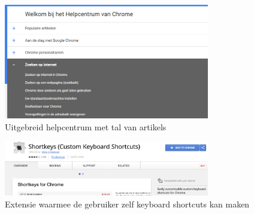 \documentclass[12pt]{article}
\begin{document}
\begin{figure}
	\centering
	\includegraphics[width=0.8\textwidth]{helpcentrum.png}
	\caption{Uitgebreid helpcentrum met tal van artikels}
	\label{fig:helpcentrum}
\end{figure}
\begin{figure}
	\centering
	\includegraphics[width=0.8\textwidth]{shortkeys.png}
	\caption{Extensie waarmee de gebruiker zelf keyboard shortcuts kan maken}
	\label{fig:shortkeys}
\end{figure}
\end{document}
